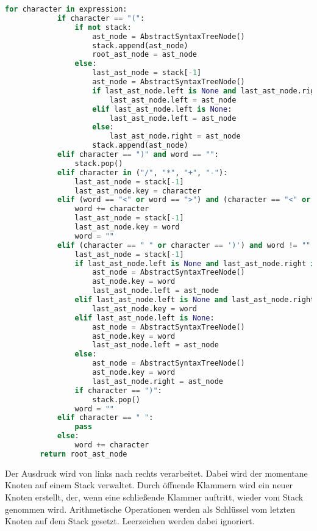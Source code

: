 \begin{lstlisting}[language=Python, caption=Klasse \textit{AbstractSyntaxTree}]
        for character in expression:
            if character == "(":
                if not stack:
                    ast_node = AbstractSyntaxTreeNode()
                    stack.append(ast_node)
                    root_ast_node = ast_node
                else:
                    last_ast_node = stack[-1]
                    ast_node = AbstractSyntaxTreeNode()
                    if last_ast_node.left is None and last_ast_node.right is None:
                        last_ast_node.left = ast_node
                    elif last_ast_node.left is None:
                        last_ast_node.left = ast_node
                    else:
                        last_ast_node.right = ast_node
                    stack.append(ast_node)
            elif character == ")" and word == "":
                stack.pop()
            elif character in ("/", "*", "+", "-"):
                last_ast_node = stack[-1]
                last_ast_node.key = character
            elif (word == "<" or word == ">") and (character == "<" or character == ">"):
                word += character
                last_ast_node = stack[-1]
                last_ast_node.key = word
                word = ""
            elif (character == " " or character == ')') and word != "":
                last_ast_node = stack[-1]
                if last_ast_node.left is None and last_ast_node.right is None and not last_ast_node.key == "":
                    ast_node = AbstractSyntaxTreeNode()
                    ast_node.key = word
                    last_ast_node.left = ast_node
                elif last_ast_node.left is None and last_ast_node.right is None:
                    last_ast_node.key = word
                elif last_ast_node.left is None:
                    ast_node = AbstractSyntaxTreeNode()
                    ast_node.key = word
                    last_ast_node.left = ast_node
                else:
                    ast_node = AbstractSyntaxTreeNode()
                    ast_node.key = word
                    last_ast_node.right = ast_node
                if character == ")":
                    stack.pop()
                word = ""
            elif character == " ":
                pass
            else:
                word += character
        return root_ast_node
\end{lstlisting}

Der Ausdruck wird von links nach rechts verarbeitet. Dabei wird der momentane Knoten auf einem Stack verwaltet.
Durch öffnende Klammern wird ein neuer Knoten erstellt, der, wenn eine schließende Klammer auftritt, wieder vom Stack genommen wird.
Arithmetische Operationen werden als Schlüssel vom letzten Knoten auf dem Stack gesetzt.
Leerzeichen werden dabei ignoriert.

